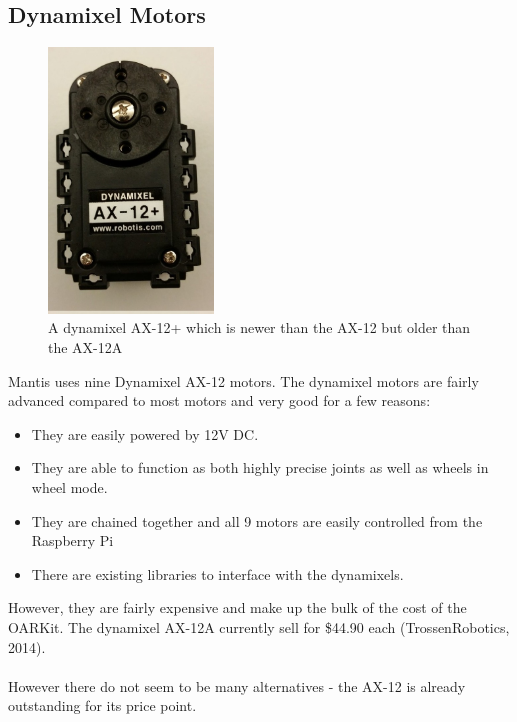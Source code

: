 \documentclass[]{article}
\begin{document}
\subsection{Dynamixel Motors}
\begin{figure}[h]
\centering
\includegraphics[height=200pt]{report_images/dynamixel.jpg}
\caption{A dynamixel AX-12+ which is newer than the AX-12 but older than the AX-12A}
\end{figure}
Mantis uses nine Dynamixel AX-12 motors. The dynamixel motors are fairly advanced compared to most motors and very good for a few reasons:
\begin{itemize}
  \item They are easily powered by 12V DC.
  \item They are able to function as both highly precise joints as well as wheels in wheel mode.
  \item They are chained together and all 9 motors are easily controlled from the Raspberry Pi
  \item There are existing libraries to interface with the dynamixels.
\end{itemize}
However, they are fairly expensive and make up the bulk of the cost of the OARKit. The dynamixel AX-12A currently sell for \$44.90 each (TrossenRobotics, 2014).
\\
\\
However there do not seem to be many alternatives - the AX-12 is already outstanding for its price point.
\end{document}
